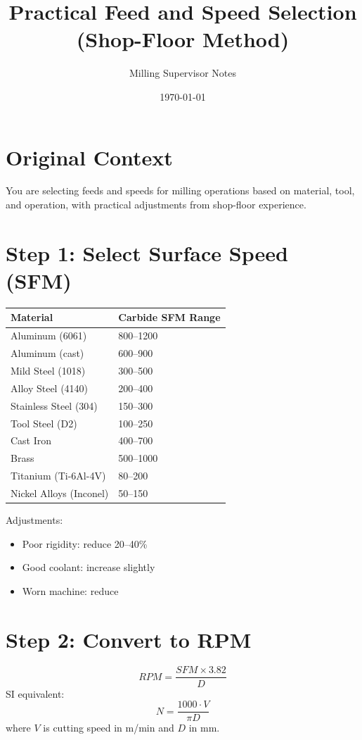 \documentclass{article}
\title{Practical Feed and Speed Selection (Shop-Floor Method)}
\author{Milling Supervisor Notes}
\date{\today}
\begin{document}
\maketitle

\section*{Original Context}
You are selecting feeds and speeds for milling operations based on material, tool, and operation, with practical adjustments from shop-floor experience.

\section*{Step 1: Select Surface Speed (SFM)}

\begin{center}
\begin{tabular}{ll}
\toprule
Material & Carbide SFM Range \\
\midrule
Aluminum (6061) & 800--1200 \\
Aluminum (cast) & 600--900 \\
Mild Steel (1018) & 300--500 \\
Alloy Steel (4140) & 200--400 \\
Stainless Steel (304) & 150--300 \\
Tool Steel (D2) & 100--250 \\
Cast Iron & 400--700 \\
Brass & 500--1000 \\
Titanium (Ti-6Al-4V) & 80--200 \\
Nickel Alloys (Inconel) & 50--150 \\
\bottomrule
\end{tabular}
\end{center}

Adjustments:
\begin{itemize}
\item Poor rigidity: reduce 20--40\%
\item Good coolant: increase slightly
\item Worn machine: reduce
\end{itemize}

\section*{Step 2: Convert to RPM}
\[
RPM = \frac{SFM \times 3.82}{D}
\]
SI equivalent:
\[
N = \frac{1000 \cdot V}{\pi D}
\]
where $V$ is cutting speed in m/min and $D$ in mm.
\end{document}

